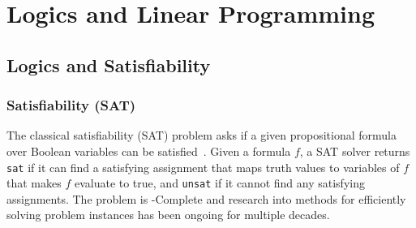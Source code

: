 \documentclass[oneside,11pt,dvipsnames]{book}
\numberwithin{equation}{section}
\theoremstyle{definition}
\theoremstyle{remark}
\newcommand{\sat}{\texttt{sat}}
\newcommand{\unsat}{\texttt{unsat}}
\begin{document}
\begin{table}
\begin{tabular}{l|l|l}
    \bottomrule
\end{tabular}    
\end{table}

\chapter{Logics and Linear Programming}\label{chap:logics}

\section{Logics and Satisfiability}\label{sec:logics-sat}


\subsection{Satisfiability (SAT)}\label{sec:sat}
The classical satisfiability (SAT) problem asks if a given propositional formula over Boolean variables can be satisfied~\cite{biere2009handbook}.  Given a formula $f$, a SAT solver returns \sat{} if it can find a satisfying assignment that maps truth values to variables of $f$ that makes $f$ evaluate to true, and \unsat{} if it cannot find any satisfying assignments. The problem is \NP-Complete and research into methods for efficiently solving  problem instances has been ongoing for multiple decades.
\end{document}
